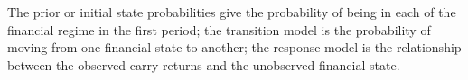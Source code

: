 \documentclass[12pt, a4paper, oneside]{article} %
\begin{document}

The prior or initial state probabilities give the probability of being in each of the financial regime in the first period; the transition model is the probability of moving from one financial state to another; the response model is the relationship between the observed carry-returns and the unobserved financial state.  
\end{document}
